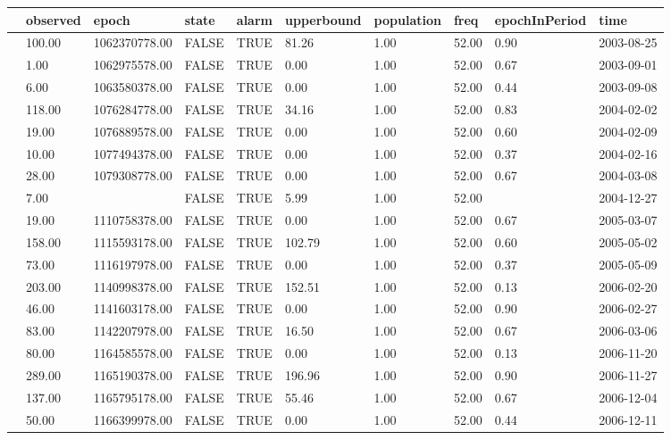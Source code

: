 \begin{table}[ht]
 \begin{adjustwidth}{-2cm}{}
\begin{tabular}{llllllllll}
  \hline
 & observed & epoch & state & alarm & upperbound & population & freq & epochInPeriod & time \\ 
  \hline
 & 100.00 & 1062370778.00 & FALSE & TRUE & 81.26 & 1.00 & 52.00 & 0.90 & 2003-08-25 \\ 
 & 1.00 & 1062975578.00 & FALSE & TRUE & 0.00 & 1.00 & 52.00 & 0.67 & 2003-09-01 \\ 
 & 6.00 & 1063580378.00 & FALSE & TRUE & 0.00 & 1.00 & 52.00 & 0.44 & 2003-09-08 \\ 
 & 118.00 & 1076284778.00 & FALSE & TRUE & 34.16 & 1.00 & 52.00 & 0.83 & 2004-02-02 \\ 
 & 19.00 & 1076889578.00 & FALSE & TRUE & 0.00 & 1.00 & 52.00 & 0.60 & 2004-02-09 \\ 
 & 10.00 & 1077494378.00 & FALSE & TRUE & 0.00 & 1.00 & 52.00 & 0.37 & 2004-02-16 \\ 
 & 28.00 & 1079308778.00 & FALSE & TRUE & 0.00 & 1.00 & 52.00 & 0.67 & 2004-03-08 \\ 
 & 7.00 &  & FALSE & TRUE & 5.99 & 1.00 & 52.00 &  & 2004-12-27 \\ 
 & 19.00 & 1110758378.00 & FALSE & TRUE & 0.00 & 1.00 & 52.00 & 0.67 & 2005-03-07 \\ 
 & 158.00 & 1115593178.00 & FALSE & TRUE & 102.79 & 1.00 & 52.00 & 0.60 & 2005-05-02 \\ 
 & 73.00 & 1116197978.00 & FALSE & TRUE & 0.00 & 1.00 & 52.00 & 0.37 & 2005-05-09 \\ 
 & 203.00 & 1140998378.00 & FALSE & TRUE & 152.51 & 1.00 & 52.00 & 0.13 & 2006-02-20 \\ 
 & 46.00 & 1141603178.00 & FALSE & TRUE & 0.00 & 1.00 & 52.00 & 0.90 & 2006-02-27 \\ 
 & 83.00 & 1142207978.00 & FALSE & TRUE & 16.50 & 1.00 & 52.00 & 0.67 & 2006-03-06 \\ 
 & 80.00 & 1164585578.00 & FALSE & TRUE & 0.00 & 1.00 & 52.00 & 0.13 & 2006-11-20 \\ 
 & 289.00 & 1165190378.00 & FALSE & TRUE & 196.96 & 1.00 & 52.00 & 0.90 & 2006-11-27 \\ 
 & 137.00 & 1165795178.00 & FALSE & TRUE & 55.46 & 1.00 & 52.00 & 0.67 & 2006-12-04 \\ 
 & 50.00 & 1166399978.00 & FALSE & TRUE & 0.00 & 1.00 & 52.00 & 0.44 & 2006-12-11 \\ 

\end{tabular}
\end{adjustwidth}
\end{table}
